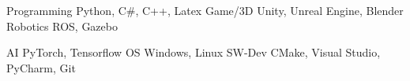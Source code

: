 

\begin{cvskills}

  \cvskillnobreaktwo
    {Programming} %
    {Python, C\#, C++, Latex} %
    {Game/3D} %
    {Unity, Unreal Engine, Blender} %
    {Robotics} %
    {ROS, Gazebo} %



  \cvskillnobreakthree
    {AI} %
    {PyTorch, Tensorflow} %
    {OS} %
    {Windows, Linux} %
    {SW-Dev} %
    {CMake, Visual Studio, PyCharm, Git} %
    


\end{cvskills}
